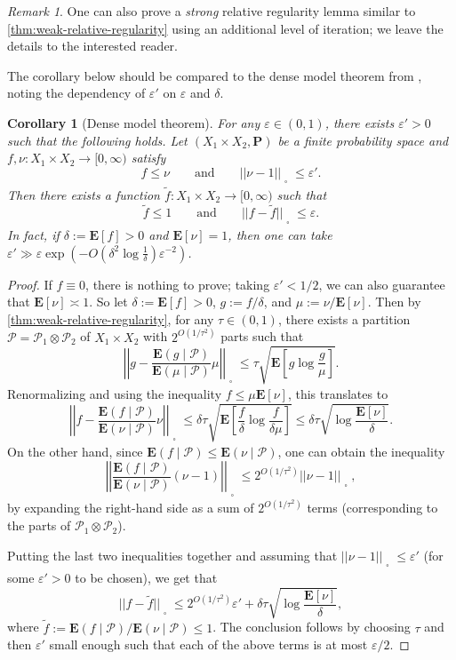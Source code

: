 \documentclass[reqno,11pt]{amsart}
\newtheorem{corollary}[theorem]{Corollary}
\theoremstyle{definition}
\theoremstyle{remark}
\newtheorem*{remark}{Remark}
\numberwithin{equation}{section}
\renewcommand{\P}{\mathbf{P}}
\newcommand{\E}{\mathbf{E}}
\newcommand{\mP}{\mathcal{P}}
\newcommand{\eps}{\varepsilon}
\renewcommand{\tilde}{\widetilde}
\newcommand{\sq}{_{\substack{ \\ \square}}}
\begin{document}
\begin{remark}
One can also prove a \emph{strong} relative regularity lemma similar to \cref{thm:weak-relative-regularity} using an additional level of iteration; we leave the details to the interested reader.
\end{remark}

The corollary below should be compared to the dense model theorem from \cite{conlon2014green}, noting the dependency of $\eps'$ on $\eps$ and $\delta$.

\begin{corollary}[Dense model theorem]
For any $\eps \in (0, 1)$, there exists $\eps' > 0$ such that the following holds. Let $(X_1 \times X_2, \P)$ be a finite probability space and $f, \nu : X_1 \times X_2 \to [0, \infty)$ satisfy
\[
    f \le \nu \qquad \text{and} \qquad 
    ||\nu - 1||\sq \le \eps'.
\]
Then there exists a function $\tilde{f} : X_1 \times X_2 \to [0, \infty)$ such that 
\[
    \tilde{f} \le 1 \qquad \text{and} \qquad ||f - \tilde{f}||\sq \le \eps.
\]
In fact, if $\delta := \E[f] > 0$ and $\E[\nu] = 1$, then one can take
$\eps' \gg \eps \exp\left(-O\left( \delta^2 \log \frac{1}{\delta}\right) \eps^{-2} \right)$.
\end{corollary}

\begin{proof}
If $f \equiv 0$, there is nothing to prove; taking $\eps' < 1/2$, we can also guarantee that $\E[\nu] \asymp 1$. So let $\delta := \E[f] > 0$, $g := f/\delta$, and $\mu := \nu/\E[\nu]$. Then by \cref{thm:weak-relative-regularity}, for any $\tau \in (0, 1)$, there exists a partition $\mP = \mP_1 \otimes \mP_2$ of $X_1 \times X_2$ with $2^{O(1/\tau^2)}$ parts such that 
\[
    \left\vert \left\vert 
    g - \frac{\E(g \mid \mP)}{\E(\mu \mid \mP)} \mu 
    \right\vert \right\vert\sq 
    \le 
    \tau \sqrt{\E\left[g \log \frac{g}{\mu} \right]}.
\]
Renormalizing and using the inequality $f \le \mu \E[\nu]$, this translates to
\[
    \left\vert \left\vert 
    f - \frac{\E(f \mid \mP)}{\E(\nu \mid \mP)} \nu 
    \right\vert \right\vert\sq 
    \le 
    \delta \tau \sqrt{\E\left[\frac{f}{\delta} \log \frac{f}{\delta \mu} \right]}
    \le 
    \delta \tau \sqrt{\log \frac{\E[\nu]}{\delta}}.
\]
On the other hand, since $\E(f \mid \mP) \le \E(\nu \mid \mP)$, one can obtain the inequality
\[
    \left\vert \left\vert 
    \frac{\E(f \mid \mP)}{\E(\nu \mid \mP)} (\nu - 1) 
    \right\vert \right\vert\sq 
    \le 
    2^{O(1/\tau^2)}
    ||\nu - 1||\sq,
\]
by expanding the right-hand side as a sum of $2^{O(1/\tau^2)}$ terms (corresponding to the parts of $\mP_1 \otimes \mP_2$).

Putting the last two inequalities together and assuming that $||\nu - 1||\sq \le \eps'$ (for some $\eps' > 0$ to be chosen), we get that
\[
    ||f - \tilde{f}||\sq 
    \le 
    2^{O(1/\tau^2)} \eps' + \delta \tau \sqrt{\log \frac{\E[\nu]}{\delta}},
\]
where $\tilde{f} := \E(f \mid \mP)/\E(\nu \mid \mP) \le 1$. The conclusion follows by choosing $\tau$ and then $\eps'$ small enough such that each of the above terms is at most $\eps/2$.
\end{proof}



%
%



\end{document}
